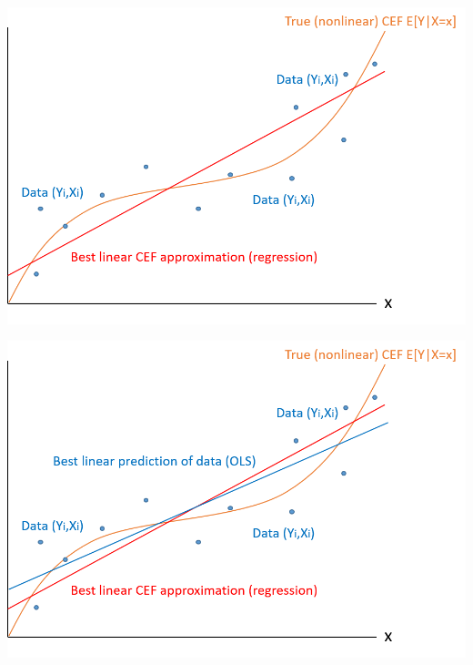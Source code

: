 \documentclass[11pt,handout,aspectratio=169]{beamer}
\begin{document}
\begin{frame}
	
	\begin{center}
		\hspace{0.7cm}\includegraphics[scale=0.7]{ols3.png}
	\end{center}
	
\end{frame}

\begin{frame}
	
	\begin{center}
		\hspace{0.7cm}\includegraphics[scale=0.7]{ols4.png}
	\end{center}
	
\end{frame}

	
\end{document}
